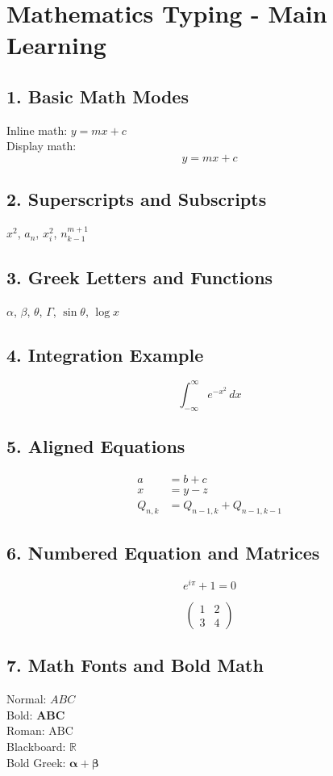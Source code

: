 \documentclass{article}
\begin{document}
\section{Mathematics Typing - Main Learning}

\subsection{1. Basic Math Modes}
Inline math: $y = mx + c$ \\
Display math:
\[
y = mx + c
\]

\subsection{2. Superscripts and Subscripts}
$x^2$, $a_n$, $x_i^2$, $n_{k-1}^{m+1}$

\subsection{3. Greek Letters and Functions}
$\alpha$, $\beta$, $\theta$, $\Gamma$, $\sin\theta$, $\log x$

\subsection{4. Integration Example}
\[
\int_{-\infty}^{\infty} e^{-x^2} \, dx
\]

\subsection{5. Aligned Equations}
\begin{align*}
a & = b + c \\
x & = y - z \\
Q_{n,k} & = Q_{n-1,k} + Q_{n-1,k-1}
\end{align*}

\subsection{6. Numbered Equation and Matrices}
\begin{equation}
e^{i\pi} + 1 = 0
\end{equation}

\[
\begin{pmatrix}
1 & 2 \\
3 & 4
\end{pmatrix}
\]

\subsection{7. Math Fonts and Bold Math}
Normal: $ABC$ \\
Bold: $\mathbf{ABC}$ \\
Roman: $\mathrm{ABC}$ \\
Blackboard: $\mathbb{R}$ \\
Bold Greek: $\bm{\alpha} + \bm{\beta}$
\end{document}
